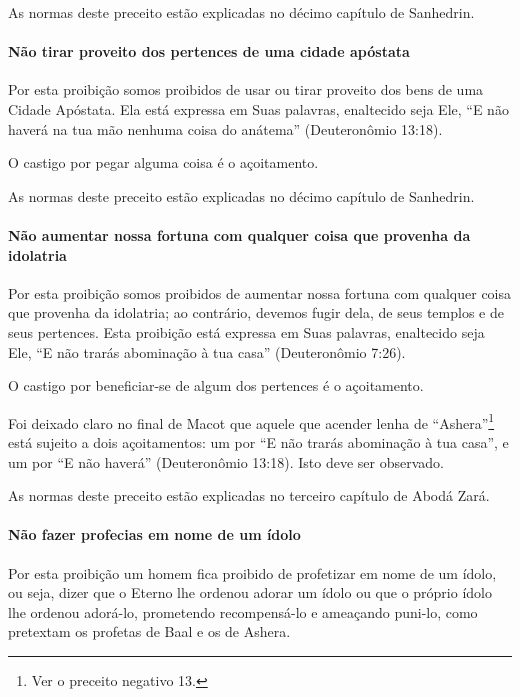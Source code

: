As normas deste preceito estão explicadas no décimo capítulo de Sanhedrin.

\paragraph{Não tirar proveito dos pertences de uma cidade apóstata}

Por esta proibição somos proibidos de usar ou tirar proveito dos bens de
uma Cidade Apóstata. Ela está expressa em Suas palavras, enaltecido seja
Ele, ``E não haverá na tua mão nenhuma coisa do anátema'' (Deuteronômio
13:18).

O castigo por pegar alguma coisa é o açoitamento.

As normas deste preceito estão explicadas no décimo capítulo de Sanhedrin.

\paragraph{Não aumentar nossa fortuna com qualquer coisa que provenha da idolatria}

Por esta proibição somos proibidos de aumentar nossa fortuna com
qualquer coisa que provenha da idolatria; ao contrário, devemos fugir
dela, de seus templos e de seus pertences. Esta proibição está expressa
em Suas palavras, enaltecido seja Ele, ``E não trarás abominação à tua casa''
(Deuteronômio 7:26).

O castigo por beneficiar-se de algum dos pertences é o açoitamento.

Foi deixado claro no final de Macot que aquele que acender lenha de
``Ashera''\footnote{Ver o preceito negativo 13.} está sujeito a dois açoitamentos: um
por ``E não trarás abominação à tua casa'', e um por ``E não haverá''
(Deuteronômio 13:18). Isto deve ser observado.

As normas deste preceito estão explicadas no terceiro capítulo de Abodá
Zará.

\paragraph{Não fazer profecias em nome de um ídolo}

Por esta proibição um homem fica proibido de profetizar em nome de um
ídolo, ou seja, dizer que o Eterno lhe ordenou adorar um ídolo ou que o
próprio ídolo lhe ordenou adorá-lo, prometendo recompensá-lo e
ameaçando puni-lo, como pretextam os profetas de Baal e os de Ashera.

